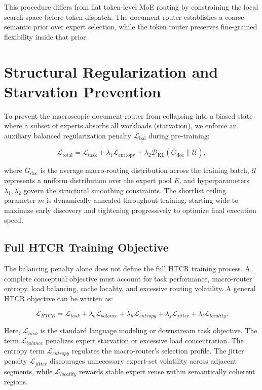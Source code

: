 This procedure differs from flat token-level MoE routing by constraining the local search space before token dispatch. The document router establishes a coarse semantic prior over expert selection, while the token router preserves fine-grained flexibility inside that prior.

\chapter{Structural Regularization and Starvation Prevention}

To prevent the macroscopic document-router from collapsing into a biased state where a subset of experts absorbs all workloads (starvation), we enforce an auxiliary balanced regularization penalty $\mathcal{L}_{\text{bal}}$ during pre-training:

\begin{equation}
\mathcal{L}_{\text{total}} = \mathcal{L}_{\text{task}} + \lambda_1 \mathcal{L}_{\text{entropy}} + \lambda_2 \mathcal{D}_{\text{KL}}\left(\bar{G}_{\text{doc}} \parallel \mathcal{U}\right),
\end{equation}

where $\bar{G}_{\text{doc}}$ is the average macro-routing distribution across the training batch, $\mathcal{U}$ represents a uniform distribution over the expert pool $E$, and hyperparameters $\lambda_1, \lambda_2$ govern the structural smoothing constraints. The shortlist ceiling parameter $m$ is dynamically annealed throughout training, starting wide to maximize early discovery and tightening progressively to optimize final execution speed.

\section{Full HTCR Training Objective}

The balancing penalty alone does not define the full HTCR training process. A complete conceptual objective must account for task performance, macro-router entropy, load balancing, cache locality, and excessive routing volatility. A general HTCR objective can be written as:

\begin{equation}
\mathcal{L}_{HTCR}
=
\mathcal{L}_{task}
+
\lambda_b \mathcal{L}_{balance}
+
\lambda_h \mathcal{L}_{entropy}
+
\lambda_j \mathcal{L}_{jitter}
+
\lambda_l \mathcal{L}_{locality}.
\end{equation}

Here, $\mathcal{L}_{task}$ is the standard language modeling or downstream task objective. The term $\mathcal{L}_{balance}$ penalizes expert starvation or excessive load concentration. The entropy term $\mathcal{L}_{entropy}$ regulates the macro-router's selection profile. The jitter penalty $\mathcal{L}_{jitter}$ discourages unnecessary expert-set volatility across adjacent segments, while $\mathcal{L}_{locality}$ rewards stable expert reuse within semantically coherent regions.

